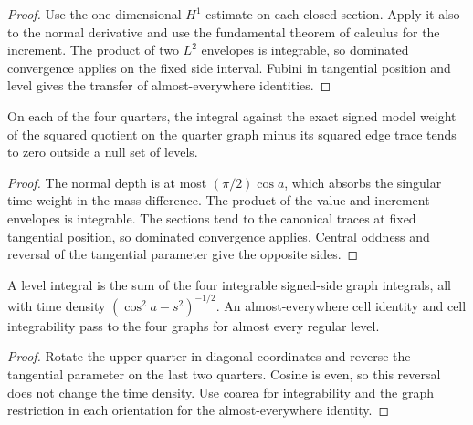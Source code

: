 \begin{proof}
\leanok
Use the one-dimensional $H^1$ estimate on each closed section.
Apply it also to the normal derivative and use the fundamental theorem
of calculus for the increment. The product of two $L^2$ envelopes
is integrable, so dominated convergence applies on the fixed side interval.
Fubini in tangential position and level gives the transfer of
almost-everywhere identities.
\end{proof}

\begin{lemma}
\label{lem:mixed-quarter-mass-replacement}
\leanok
On each of the four quarters, the integral against the exact signed
model weight of the squared quotient on the quarter graph minus its
squared edge trace tends to zero outside a null set of levels.
\end{lemma}

\begin{proof}
\leanok
The normal depth is at most $(\pi/2)\cos a$, which absorbs the singular
time weight in the mass difference. The product of the value and
increment envelopes is integrable. The sections tend to the canonical
traces at fixed tangential position, so dominated convergence applies.
Central oddness and reversal of the tangential parameter give the
opposite sides.
\end{proof}

\begin{lemma}
\label{lem:mixed-signed-quarters}
\leanok
A level integral is the sum of the four integrable signed-side graph
integrals, all with time density $(\cos^2 a-s^2)^{-1/2}$.
An almost-everywhere cell identity and cell integrability pass to the
four graphs for almost every regular level.
\end{lemma}
\begin{proof}
\leanok
Rotate the upper quarter in diagonal coordinates and reverse the
tangential parameter on the last two quarters. Cosine is even, so
this reversal does not change the time density. Use coarea for
integrability and the graph restriction in each orientation for the
almost-everywhere identity.
\end{proof}


